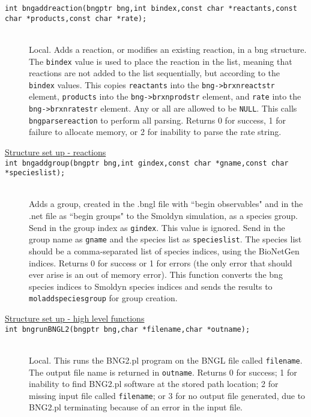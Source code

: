 \documentclass {book}
\begin{document}
\begin{description}
\item[\texttt{int bngaddreaction(bngptr bng,int bindex,const char *reactants,const char *products,const char *rate);}]
\hfill \\
Local.  Adds a reaction, or modifies an existing reaction, in a bng structure.  The \texttt{bindex} value is used to place the reaction in the list, meaning that reactions are not added to the list sequentially, but according to the \texttt{bindex} values.  This copies \texttt{reactants} into the \texttt{bng->brxnreactstr} element, \texttt{products} into the \texttt{bng->brxnprodstr} element, and \texttt{rate} into the \texttt{bng->brxnratestr} element.  Any or all are allowed to be \texttt{NULL}.  This calls \texttt{bngparsereaction} to perform all parsing.  Returns 0 for success, 1 for failure to allocate memory, or 2 for inability to parse the rate string.

\item[\underline{Structure set up - reactions}]

\item[\texttt{int bngaddgroup(bngptr bng,int gindex,const char *gname,const char *specieslist);}]
\hfill \\
Adds a group, created in the .bngl file with ``begin observables" and in the .net file as ``begin groups" to the Smoldyn simulation, as a species group.  Send in the group index as \texttt{gindex}.  This value is ignored.  Send in the group name as \texttt{gname} and the species list as \texttt{specieslist}.  The species list should be a comma-separated list of species indices, using the BioNetGen indices.  Returns 0 for success or 1 for errors (the only error that should ever arise is an out of memory error).  This function converts the bng species indices to Smoldyn species indices and sends the results to \texttt{moladdspeciesgroup} for group creation.

\item[\underline{Structure set up - high level functions}]

\item[\texttt{int bngrunBNGL2(bngptr bng,char *filename,char *outname);}]
\hfill \\
Local.  This runs the BNG2.pl program on the BNGL file called \texttt{filename}.  The output file name is returned in \texttt{outname}.  Returns 0 for success; 1 for inability to find BNG2.pl software at the stored path location; 2 for missing input file called \texttt{filename}; or 3 for no output file generated, due to BNG2.pl terminating because of an error in the input file.


\end{description}
\end{document}
